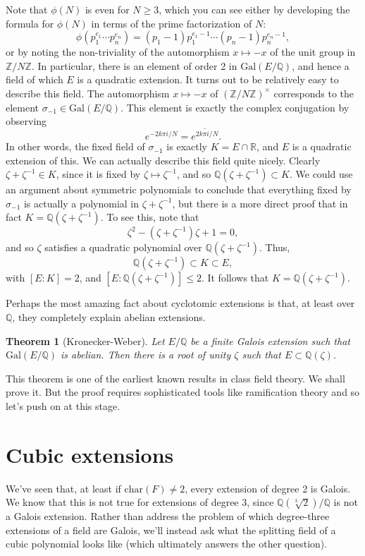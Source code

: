 \documentclass[12pt]{report}
\newtheorem{thm}{Theorem}[section]
\theoremstyle{definition}
\def\ZZ{\mathbb{Z}}
\def\QQ{\mathbb{Q}}
\def\RR{\mathbb{R}}
\def\Gal{\text{Gal}}
\def\char{\text{char}}
\begin{document}
Note that $\phi(N)$ is even for $N \geq 3$, which you can see either by developing the formula for $\phi(N)$ in terms of the prime factorization of $N$:
$$\phi(p_1^{e_1}\cdots p_n^{e_n}) = (p_1-1)p_1^{e_1-1}\cdots (p_n-1) p_n^{e_n-1},$$
or by noting the non-triviality of the automorphism $x \mapsto -x$ of the unit group in $\ZZ/N\ZZ$. In particular, there is an element of order 2 in $\Gal(E/\QQ)$, and hence a field of which $E$ is a quadratic extension. It turns out to be relatively easy to describe this field. The automorphism $x \mapsto -x$ of $(\ZZ/N\ZZ)^\times$ corresponds to the element $\sigma_{-1}\in \Gal(E/\QQ)$. This element is exactly the complex conjugation by observing $$e^{-2k\pi i/N} =\overline{e^{2k\pi i /N}}.$$
In other words, the fixed field of $\sigma_{-1}$ is exactly $K = E\cap \RR$, and $E$ is a quadratic extension of this. We can actually describe this field quite nicely. Clearly $\zeta + \zeta^{-1} \in K$, since it is fixed by $\zeta \mapsto \zeta^{-1}$, and so $\QQ(\zeta + \zeta^{-1}) \subset K$. We could use an argument about symmetric polynomials to conclude that everything fixed by $\sigma_{-1}$ is actually a polynomial in $\zeta + \zeta^{-1}$, but there is a more direct proof that in fact $K = \QQ(\zeta + \zeta^{-1})$. To see this, note that
$$\zeta^2 - (\zeta + \zeta^{-1})\zeta + 1 = 0,$$
and so $\zeta$ satisfies a quadratic polynomial over $\QQ(\zeta + \zeta^{-1})$. Thus, $$\QQ(\zeta + \zeta^{-1}) \subset K \subset E,$$
with $[E : K] = 2$, and $[E : \QQ(\zeta + \zeta^{-1})] \leq 2$. It follows that $K = \QQ(\zeta + \zeta^{-1})$.

Perhaps the most amazing fact about cyclotomic extensions is that, at least over $\QQ$, they completely explain abelian extensions.

\begin{thm}[Kronecker-Weber]
    Let $E/\QQ$ be a finite Galois extension such that $\Gal(E/\QQ)$ is abelian. Then there is a root of unity $\zeta$ such that $E \subset \QQ(\zeta)$.
\end{thm}

This theorem is one of the earliest known results in class field theory. We shall prove it. But the proof requires sophisticated tools like ramification theory and so let's push on at this stage.

\section{Cubic extensions}

We've seen that, at least if $\char(F) \not= 2$, every extension of degree 2 is Galois. We know that this is not true for extensions of degree 3, since $\QQ(\sqrt[3]{2})/\QQ$ is not a Galois extension. Rather than address the problem of which degree-three extensions of a field are Galois, we'll instead ask what the splitting field of a cubic polynomial looks like (which ultimately answers the other question).
\end{document}
